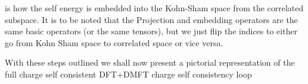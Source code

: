 \documentclass[12pt,letter]{article}
\begin{document}
is how the self energy is embedded into the Kohn-Sham space from the correlated subspace. It is to be noted that the Projection and embedding operators are the same basic operators (or the same tensors), but we just flip the indices to either go from Kohn Sham space to correlated space or vice versa.

With these steps outlined we shall now present a pictorial representation of the full charge self consistent DFT+DMFT charge self consistency loop

 

 
\end{document}

